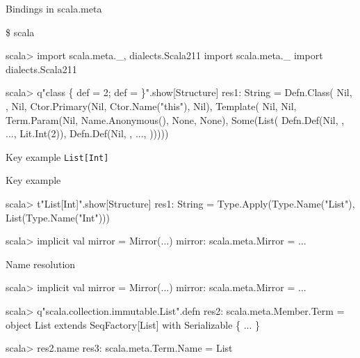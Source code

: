 \documentclass[svgnames,dvipsnames,hyperref={bookmarks=false},usepdftitle=false]{beamer}
\begin{document}
\begin{frame}[fragile]{Bindings in scala.meta}
\begin{semiverbatim}
\small
\$ scala

scala> import scala.meta.\_, dialects.Scala211
import scala.meta.\_
import dialects.Scala211

scala> q"class \text{\color{blue}{C}} \{ def \text{\color{red}{x}} = 2; def \text{\color{LimeGreen}{y}} = \text{\color{red}{x}} \}".show[Structure]
res1: String = Defn.Class(
  Nil, \text{\color{blue}{Type.Name("C")}}, Nil,
  Ctor.Primary(Nil, Ctor.Name("this"), Nil),
  Template(
    Nil, Nil,
    Term.Param(Nil, Name.Anonymous(), None, None),
    Some(List(
      Defn.Def(Nil, \text{\color{red}{Term.Name("x")}}, ..., Lit.Int(2)),
      Defn.Def(Nil, \text{\color{LimeGreen}{Term.Name("y")}}, ..., \text{\color{red}{Term.Name("x")}})))))
\end{semiverbatim}
\end{frame}

\begin{frame}[fragile]{Key example}
\texttt{List[Int]}
\end{frame}

\begin{frame}[fragile]{Key example}
\begin{semiverbatim}
\small
scala> t"List[Int]".show[Structure]
res1: String =
Type.Apply(Type.Name("List"), List(Type.Name("Int")))

scala> implicit val mirror = Mirror(...)
mirror: scala.meta.Mirror = ...

\end{semiverbatim}
\end{frame}

\begin{frame}[fragile]{Name resolution}
\begin{semiverbatim}
scala> implicit val mirror = Mirror(...)
mirror: scala.meta.Mirror = ...

scala> q"scala.collection.immutable.List".defn
res2: scala.meta.Member.Term = object List extends
SeqFactory[List] with Serializable \{ ... \}

scala> res2.name
res3: scala.meta.Term.Name = List
\end{semiverbatim}
\end{frame}
\end{document}
